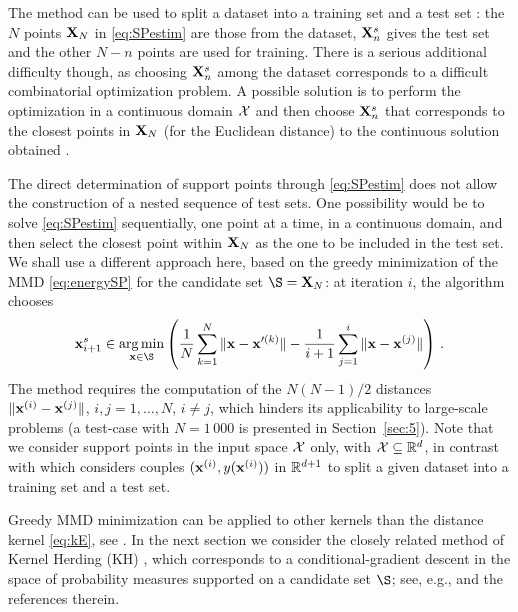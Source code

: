 The method can be used to split a dataset into a training set and a test set \cite{josvak21}: the $N$ points ${\bf X}_N$ in \eqref{eq:SPestim} are those from the dataset, ${\bf X}_n^s$ gives the test set and the other $N-n$ points are used for training. There is a serious additional difficulty though, as choosing ${\bf X}_n^s$ among the dataset corresponds to a difficult combinatorial optimization problem. A possible solution is to perform the optimization in a continuous domain $\mathcal{X}$ and then choose ${\bf X}_n^s$ that corresponds to the closest points in ${\bf X}_N$ (for the Euclidean distance) to the continuous solution obtained \cite{josvak21}. 

The direct determination of support points through \eqref{eq:SPestim} does not allow the construction of a nested sequence of test sets. One possibility would be to solve \eqref{eq:SPestim} sequentially, one point at a time, in a continuous domain, and then select the closest point within ${\bf X}_N$ as the one to be included in the test set. 
We shall use a different approach here, based on the greedy minimization of the MMD \eqref{eq:energySP} for the candidate set $\S=\bX_N$: at iteration $i$, the algorithm chooses
\begin{equation}\label{eq:GreedySP}
\bx_{i+1}^s \in \argmin_{\bx\in\S} \left( \frac{1}{N} \sum_{k=1}^N \|\bx-\bx'^{(k)}\| - \frac{1}{i+1} \sum_{j=1}^{i} \|\bx-\bx^{(j)}\| \right) \,.
\end{equation}
The method requires the computation of the $N(N-1)/2$ distances $\|{\bf x}^{(i)}-{\bf x}^{(j)}\|$, $i,j=1,\ldots,N$, $i\neq j$, which hinders its applicability to large-scale problems (a test-case with $N=1\,000$ is presented in Section~\ref{sec:5}). Note that we consider support points in the input space $\mathcal{X}$ only, with $\mathcal{X}\subseteq\mathbb{R}^d$, in contrast with \cite{josvak21} which considers couples $({\bf x}^{(i)},y({\bf x}^{(i)}))$ in $\mathbb{R}^{d+1}$ to split a given dataset into a training set and a test set. 

Greedy MMD minimization can be applied to other kernels than the distance kernel \eqref{eq:kE}, see \cite{TeymurGRO2021, pro21}. In the next section we consider the closely related method of Kernel Herding (KH) \cite{chewel10}, which corresponds to a conditional-gradient descent   in the space of probability measures supported on a candidate set $\S$; see, e.g., \cite{prozhi20} and the references therein.

